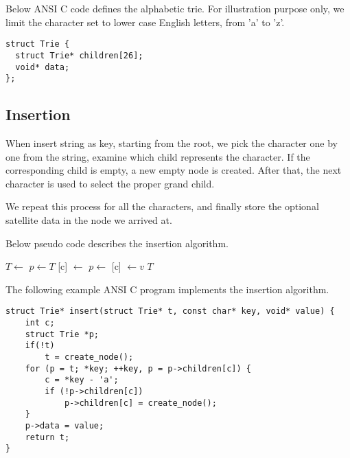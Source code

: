 \documentclass{article}
\begin{document}
Below ANSI C code defines the alphabetic trie. For illustration purpose only,
we limit the character set to lower case English letters, from 'a' to 'z'.

\lstset{language=C}
\begin{lstlisting}
struct Trie {
  struct Trie* children[26];
  void* data;
};
\end{lstlisting}


\subsection{Insertion}

When insert string as key, starting from the root, we pick the character
one by one from the string, examine which child represents the character.
If the corresponding child is empty, a new empty node is created.
After that, the next character is used to select the proper grand child.

We repeat this process for all the characters, and finally store the
optional satellite data in the node we arrived at.

Below pseudo code describes the insertion algorithm.

\begin{algorithmic}[1]
    \State $T \gets $ 
  \EndIf
  \State $p \gets T$
      \State {}[c] $\gets$ 
    \EndIf
    \State $p \gets $ [c]
  \EndFor
  \State {} $\gets v$
  \State \Return $T$
\EndFunction
\end{algorithmic}

The following example ANSI C program implements the insertion algorithm.

\lstset{language=C}
\begin{lstlisting}
struct Trie* insert(struct Trie* t, const char* key, void* value) {
    int c;
    struct Trie *p;
    if(!t)
        t = create_node();
    for (p = t; *key; ++key, p = p->children[c]) {
        c = *key - 'a';
        if (!p->children[c])
            p->children[c] = create_node();
    }
    p->data = value;
    return t;
}
\end{lstlisting}
\end{document}
